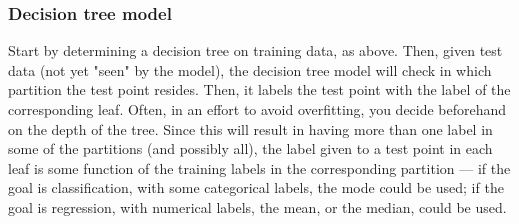 \documentclass[smaller]{beamer}
\theoremstyle{example}
\begin{document}






\begin{frame}
    \frametitle{Decision tree model}
    Start by determining a decision tree on training data, as above. Then, given test data (not yet "seen" by the model), the decision tree model will check in which partition the test point resides. Then, it labels the test point with the label of the corresponding leaf. Often, in an effort to avoid overfitting, you decide beforehand on the depth of the tree. Since this will result in having more than one label in some of the partitions (and possibly all), the label given to a test point in each leaf is some function of the training labels in the corresponding partition — if the goal is classification, with some categorical labels, the mode could be used; if the goal is regression, with numerical labels, the mean, or the median, could be used.
\end{frame}
\end{document}
